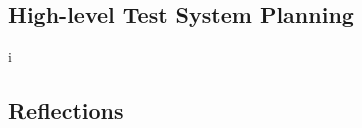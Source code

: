 %
%


\subsection{High-level Test System Planning}
i


%



\subsection{Reflections}\label{task-1c-reflect}

